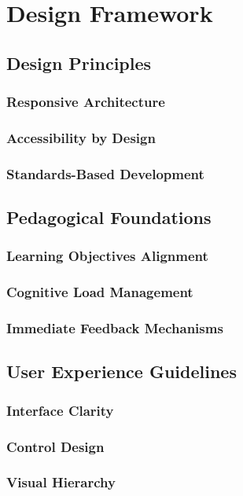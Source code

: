 \section{Design Framework}
\label{sec:framework}


\subsection{Design Principles}

\subsubsection{Responsive Architecture}

\subsubsection{Accessibility by Design}

\subsubsection{Standards-Based Development}

\subsection{Pedagogical Foundations}

\subsubsection{Learning Objectives Alignment}

\subsubsection{Cognitive Load Management}

\subsubsection{Immediate Feedback Mechanisms}

\subsection{User Experience Guidelines}

\subsubsection{Interface Clarity}

\subsubsection{Control Design}

\subsubsection{Visual Hierarchy}

